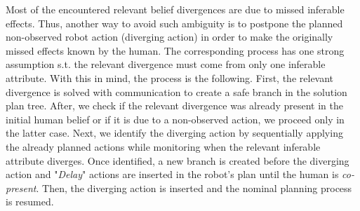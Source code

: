 \documentclass[letterpaper]{article} %
\begin{document}
Most of the encountered relevant belief divergences are due to missed inferable effects. 
Thus, another way to avoid such ambiguity is to postpone the planned non-observed robot action (diverging action) in order to make the originally missed effects known by the human. The corresponding process has one strong assumption s.t. the relevant divergence must come from only one inferable attribute. With this in mind, the process is the following. 
First, the relevant divergence is solved with communication to create a safe branch in the solution plan tree. After, we check if the relevant divergence was already present in the initial human belief or if it is due to a non-observed action, we proceed only in the latter case. Next, we identify the diverging action by sequentially applying the already planned actions while monitoring when the relevant inferable attribute diverges. Once identified, a new branch is created before the diverging action and "\textit{Delay}" actions are inserted in the robot's plan until the human is \textit{co-present}. Then, the diverging action is inserted and the nominal planning process is resumed.

\end{document}
